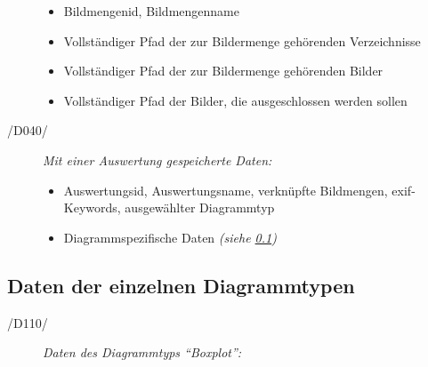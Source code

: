 \begin{description}
	\begin{itemize}
	
		\item Bildmengenid, Bildmengenname
		
		\item Vollständiger Pfad der zur Bildermenge gehörenden Verzeichnisse
		
		\item Vollständiger Pfad der zur Bildermenge gehörenden Bilder
		
		\item Vollständiger Pfad der Bilder, die ausgeschlossen werden sollen
	
	\end{itemize}
	
	\item[/D040/] \textit{Mit einer Auswertung gespeicherte Daten:}
	
	\begin{itemize}
		
		\item Auswertungsid, Auswertungsname, verknüpfte Bildmengen, \gls{exif}-Keywords, ausgewählter Diagrammtyp
		
		\item Diagrammspezifische Daten \itshape{(siehe \ref{subsec:daten-diagrammtypen})}
	
	\end{itemize}
		
\end{description}

\subsection{Daten der einzelnen Diagrammtypen}

\label{subsec:daten-diagrammtypen}

\begin{description}

	\item[/D110/] \textit{Daten des Diagrammtyps "`Boxplot"':}

\end{description}